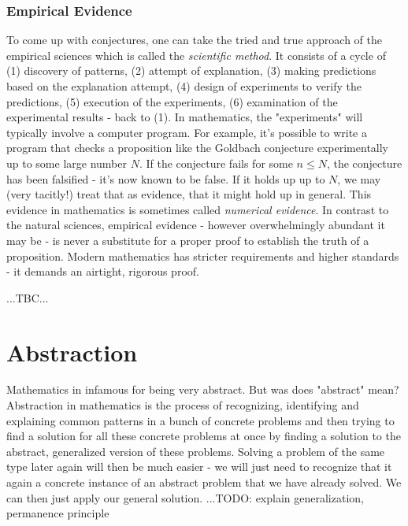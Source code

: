 \subsubsection{Empirical Evidence}
To come up with conjectures, one can take the tried and true approach of the empirical sciences which is called the \emph{scientific method}. It consists of a cycle of (1) discovery of patterns, (2) attempt of explanation, (3) making predictions based on the explanation attempt, (4) design of experiments to verify the predictions, (5) execution of the experiments, (6) examination of the experimental results - back to (1). In mathematics, the "experiments" will typically involve a computer program. For example, it's possible to write a program that checks a proposition like the Goldbach conjecture experimentally up to some large number $N$. If the conjecture fails for some $n \leq N$, the conjecture has been falsified - it's now known to be false. If it holds up up to $N$, we may (very tacitly!) treat that as evidence, that it might hold up in general. This evidence in mathematics is sometimes called \emph{numerical evidence}. In contrast to the natural sciences, empirical evidence - however overwhelmingly abundant it may be - is never a substitute for a proper proof to establish the truth of a proposition. Modern mathematics has stricter requirements and higher standards - it demands an airtight, rigorous proof.

...TBC...



\section{Abstraction}
Mathematics in infamous for being very abstract. But was does "abstract" mean? Abstraction in mathematics is the process of recognizing, identifying and explaining common patterns in a bunch of concrete problems and then trying to find a solution for all these concrete problems at once by finding a solution to the abstract, generalized version of these problems. Solving a problem of the same type later again will then be much easier - we will just need to recognize that it again a concrete instance of an abstract problem that we have already solved. We can then just apply our general solution. ...TODO: explain generalization, permanence principle



